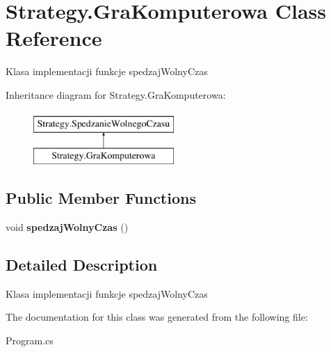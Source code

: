 \hypertarget{class_strategy_1_1_gra_komputerowa}{}\section{Strategy.\+Gra\+Komputerowa Class Reference}
\label{class_strategy_1_1_gra_komputerowa}


Klasa implementacji funkcje spedzaj\+Wolny\+Czas  


Inheritance diagram for Strategy.\+Gra\+Komputerowa\+:\begin{figure}[H]
\begin{center}
\leavevmode
\includegraphics[height=2.000000cm]{class_strategy_1_1_gra_komputerowa}
\end{center}
\end{figure}
\subsection*{Public Member Functions}
\begin{DoxyCompactItemize}
\item 
\mbox{\label{class_strategy_1_1_gra_komputerowa_a912ae8e36ee187ff9cf7343751163767}} 
void {\bfseries spedzaj\+Wolny\+Czas} ()
\end{DoxyCompactItemize}


\subsection{Detailed Description}
Klasa implementacji funkcje spedzaj\+Wolny\+Czas 



The documentation for this class was generated from the following file\+:\begin{DoxyCompactItemize}
\item 
Program.\+cs\end{DoxyCompactItemize}
